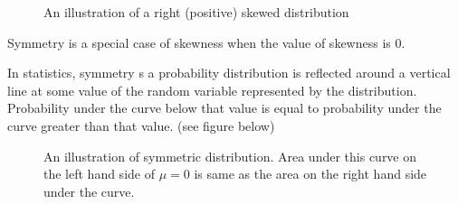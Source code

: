 \begin{figure}[H]
\begin{center}
\end{center}
\caption{An illustration of a right (positive) skewed distribution}
\end{figure}

\noindent
Symmetry is a special case of skewness when the value of skewness is $0$.

\begin{definition}[Symmetry]
In statistics, symmetry s a probability distribution is reflected around a vertical line at some value of the random variable represented by the distribution. Probability under the curve below that value is equal to probability under the curve greater than that value. (see figure below)
\end{definition}

\begin{figure}[h]
\begin{center}
\end{center}
\caption{An illustration of symmetric distribution. Area under this curve on the left hand side of $\mu = 0$ is same as the area on the right hand side under the curve.}
\end{figure}

